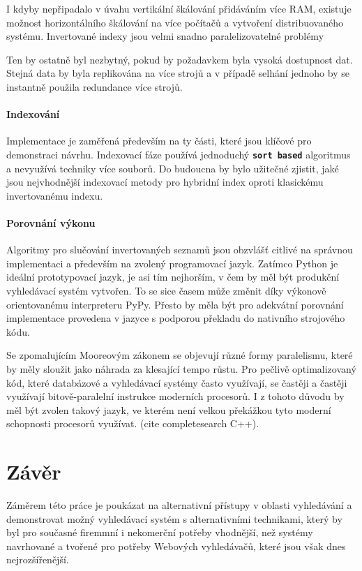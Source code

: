 \documentclass[12pt,letterpaper,oneside,openright]{book}
\newcommand{\bftt}[1]{\texttt{\textbf{#1}}}
\begin{document}
I kdyby nepřipadalo v úvahu vertikální škálování přidáváním více RAM, existuje
možnost horizontálního škálování na více počítačů a vytvoření distribuovaného
systému. Invertované indexy jsou velmi snadno paralelizovatelné problémy

Ten by ostatně byl nezbytný, pokud by požadavkem byla vysoká
dostupnost dat. Stejná data by byla replikována na více strojů a v případě
selhání jednoho by se instantně použila redundance více strojů.



\subsubsection{Indexování}
Implementace je zaměřená především na ty části, které jsou klíčové pro
demonstraci návrhu. Indexovací fáze používá jednoduchý \bftt{sort based}
algoritmus a nevyužívá techniky více souborů. Do budoucna by bylo užitečné
zjistit, jaké jsou nejvhodnější indexovací metody pro hybridní index oproti
klasickému invertovanému indexu.

\subsubsection{Porovnání výkonu}
Algoritmy pro slučování invertovaných seznamů jsou obzvlášť citlivé na správnou
implementaci a především na zvolený programovací jazyk. Zatímco Python je
ideální prototypovací jazyk, je asi tím nejhorším, v čem by měl být produkční
vyhledávací systém vytvořen. To se sice časem může změnit díky výkonově
orientovanému interpreteru PyPy. Přesto by měla být pro adekvátní porovnání
implementace provedena v jazyce s podporou překladu do nativního strojového
kódu.

Se zpomalujícím Mooreovým zákonem se objevují různé formy paralelismu, které by
měly sloužit jako náhrada za klesající tempo růstu. Pro pečlivě optimalizovaný
kód, které databázové a vyhledávací systémy často využívají, se častěji a
častěji využívají bitově-paralelní instrukce moderních procesorů. I z tohoto
důvodu by měl být zvolen takový jazyk, ve kterém není velkou překážkou tyto
moderní schopnosti procesorů využívat. (cite completesearch C++).


\chapter{Závěr}
Záměrem této práce je poukázat na alternativní přístupy v oblasti vyhledávání a
demonstrovat možný vyhledávací systém s alternativními technikami, který by byl
pro současné firemmní i nekomerční potřeby vhodnější, než systémy navrhované a
tvořené pro potřeby Webových vyhledávačů, které jsou však dnes nejrozšířenější.
\end{document}
